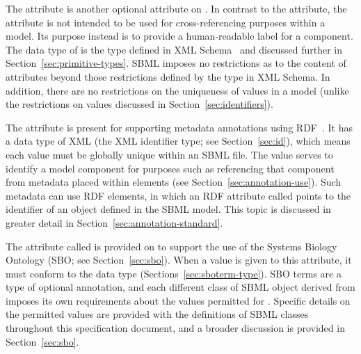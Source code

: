 \begin{blockChanged}
The attribute  is another optional attribute on \SBase.  
In contrast to the  attribute, the  attribute
is not intended to be used for cross-referencing
purposes within a model.  Its purpose instead is to provide a
human-readable label for a component.  The data type of 
 is the type  defined in XML
Schema~\citep{biron:2000,thompson:2000} and discussed further in
Section~\ref{sec:primitive-types}.  SBML imposes no restrictions
as to the content of  attributes beyond those restrictions
defined by the  type in XML Schema.
In addition, there are no restrictions on the uniqueness
of  values in a model (unlike the restrictions on
 values discussed in Section~\ref{sec:identifiers}).

\end{blockChanged}


\label{sec:metaid}

The  attribute is present for supporting metadata
annotations using RDF~\citep[Resource Description
Format;][]{lassila:1999}.  It has a data type of XML 
(the XML identifier type; see Section~\ref{sec:id}), which means
each  value must be globally unique within an SBML
file.  The  value serves to identify a model
component for purposes such as referencing that component from
metadata placed within  elements (see
Section~\ref{sec:annotation-use}).  Such metadata can use RDF
 elements, in which an RDF attribute called
 points to the  identifier of an
object defined in the SBML model.  This topic is discussed in
greater detail in Section~\ref{sec:annotation-standard}.


\label{sec:sbase-sboterm}

The attribute called  is provided on \SBase to
support the use of the Systems Biology Ontology (SBO; see
Section~\ref{sec:sbo}).  When a value is given to this attribute,
it must conform to the data type 
(Sections~\ref{sec:sboterm-type}).  SBO terms are a type of
optional annotation, and each different class of SBML object
derived from \SBase imposes its own requirements about the values
permitted for .  Specific details on the permitted
values are provided with the definitions of SBML classes
throughout this specification document, and a broader discussion
is provided in Section~\ref{sec:sbo}.


